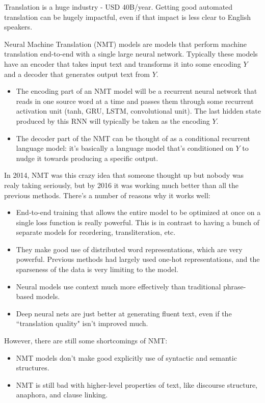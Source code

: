 Translation is a huge industry - USD 40B/year. Getting good automated translation can be hugely impactful, even if that impact is less clear to English speakers.

Neural Machine Translation (NMT) models are models that perform machine translation end-to-end with a single large neural network. Typically these models have an encoder that takes input text and transforms it into some encoding $Y$ and a decoder that generates output text from $Y$. 

\begin{itemize}
\item The encoding part of an NMT model will be a recurrent neural network that reads in one source word at a time and passes them through some recurrent activation unit (tanh, GRU, LSTM, convolutional unit). The last hidden state produced by this RNN will typically be taken as the encoding $Y$. 
\item The decoder part of the NMT can be thought of as a conditional recurrent language model: it's basically a language model that's conditioned on $Y$ to nudge it towards producing a specific output.
\end{itemize}

In 2014, NMT was this crazy idea that someone thought up but nobody was realy taking seriously, but by 2016 it was working much better than all the previous methods. There's a number of reasons why it works well:
\begin{itemize}
\item End-to-end training that allows the entire model to be optimized at once on a single loss function is really powerful. This is in contrast to having a bunch of separate models for reordering, transliteration, etc.
\item They make good use of distributed word representations, which are very powerful. Previous methods had largely used one-hot representations, and the sparseness of the data is very limiting to the model.
\item Neural models use context much more effectively than traditional phrase-based models.
\item Deep neural nets are just better at generating fluent text, even if the ``translation quality" isn't improved much.
\end{itemize}
However, there are still some shortcomings of NMT:
\begin{itemize}
\item NMT models don't make good explicitly use of syntactic and semantic structures.
\item NMT is still bad with higher-level properties of text, like discourse structure, anaphora, and clause linking.
\end{itemize}


